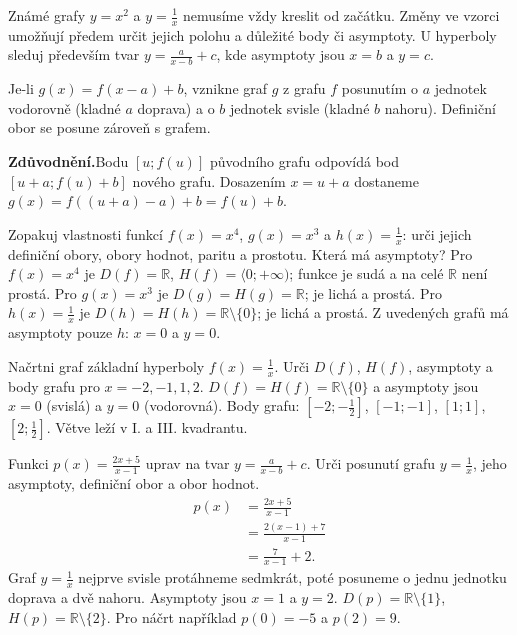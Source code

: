 \documentclass[11pt,a4paper]{article}
\begin{document}

Známé grafy $y=x^2$ a $y=\frac{1}{x}$ nemusíme vždy kreslit od začátku. Změny ve vzorci umožňují předem určit jejich polohu a důležité body či asymptoty. U hyperboly sleduj především tvar $y=\frac{a}{x-b}+c$, kde asymptoty jsou $x=b$ a $y=c$.

\begin{zadaniBox}[title={Věta - Posuny grafu funkce}]
Je-li $g(x)=f(x-a)+b$, vznikne graf $g$ z grafu $f$ posunutím o $a$ jednotek vodorovně (kladné $a$ doprava) a o $b$ jednotek svisle (kladné $b$ nahoru). Definiční obor se posune zároveň s grafem.
\end{zadaniBox}
\noindent\textbf{Zdůvodnění.}\enspace Bodu $[u;f(u)]$ původního grafu odpovídá bod $[u+a;f(u)+b]$ nového grafu. Dosazením $x=u+a$ dostaneme $g(x)=f((u+a)-a)+b=f(u)+b$.


\begin{prikladReseniBox}[title={Příklad 1}]
Zopakuj vlastnosti funkcí $f(x)=x^4$, $g(x)=x^3$ a $h(x)=\frac{1}{x}$: urči jejich definiční obory, obory hodnot, paritu a prostotu. Která má asymptoty?
\tcblower
Pro $f(x)=x^4$ je $D(f)=\mathbb R$, $H(f)=\langle0;+\infty)$; funkce je sudá a na celé $\mathbb R$ není prostá. Pro $g(x)=x^3$ je $D(g)=H(g)=\mathbb R$; je lichá a prostá. Pro $h(x)=\frac{1}{x}$ je $D(h)=H(h)=\mathbb R\setminus\{0\}$; je lichá a prostá. Z uvedených grafů má asymptoty pouze $h$: $x=0$ a $y=0$.
\end{prikladReseniBox}

\begin{prikladReseniBox}[title={Příklad 2}]
Načrtni graf základní hyperboly $f(x)=\frac{1}{x}$. Urči $D(f)$, $H(f)$, asymptoty a body grafu pro $x=-2,-1,1,2$.
\tcblower
$D(f)=H(f)=\mathbb R\setminus\{0\}$ a asymptoty jsou $x=0$ (svislá) a $y=0$ (vodorovná). Body grafu: $[-2;-\frac{1}{2}]$, $[-1;-1]$, $[1;1]$, $[2;\frac{1}{2}]$. Větve leží v I. a III. kvadrantu.
\end{prikladReseniBox}



\begin{prikladReseniBox}[title={Příklad 3}]
Funkci $p(x)=\frac{2x+5}{x-1}$ uprav na tvar $y=\frac{a}{x-b}+c$. Urči posunutí grafu $y=\frac{1}{x}$, jeho asymptoty, definiční obor a obor hodnot.
\tcblower
\[
\begin{aligned}
p(x)&=\frac{2x+5}{x-1}\\
&=\frac{2(x-1)+7}{x-1}\\
&=\frac{7}{x-1}+2.
\end{aligned}
\]
Graf $y=\frac{1}{x}$ nejprve svisle protáhneme sedmkrát, poté posuneme o jednu jednotku doprava a dvě nahoru. Asymptoty jsou $x=1$ a $y=2$. $D(p)=\mathbb R\setminus\{1\}$, $H(p)=\mathbb R\setminus\{2\}$. Pro náčrt například $p(0)=-5$ a $p(2)=9$.
\end{prikladReseniBox}
\end{document}
